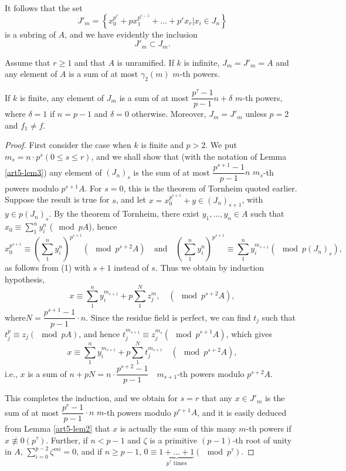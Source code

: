 It follows that the set 
$$
J'_m = \left\{ x_0^{p^r} + px_1^{p^{r-1}} + \ldots + p^r x_r | x_i \in J_n \right\}
$$
is a subring of $A$, and we have evidently the inclusion
$$
J'_m \subset J_m.
$$

\begin{prop}\label{art5-prop1}
Assume that $r \geq 1$ and that $A$ is unramified. If $k$ is infinite, $J_m = J'_m = A$ and any element of $A$ is a sum of at most $\gamma_2 (m)$ $m$-th powers.

If $k$ is finite, any element of $J_m$ is a sum of at most $\dfrac{p^\tau - 1}{p -1} n + \delta $ $m$-th powers, where $\delta=1$ if $n = p-1$ and $\delta =0$ otherwise. Moreover, $J_m = J'_m$ unless $p=2$ and $f_1 \neq f$.
\end{prop}


\begin{proof}
First consider the case when $k$ is finite and $p> 2$. We put $m_s = n \cdot p^s (0 \leq s \leq r)$, and we shall show that (with the notation of Lemma \ref{art5-lem3}) any element of $(J_n)_s$ is the sum of at most $\dfrac{p^{s+1} -1}{p-1} n$ $m_s$-th powers modulo $p^{s+1} A$. For $s=0$, this is the theorem of Tornheim quoted earlier. Suppose the result is true for $s$, and let $x = x_0^{p^{s+1}} + y \in (J_n)_{s+1}$, with $y \in p (J_n)_s$. By the theorem of Tornheim, there exist $y_1, \ldots, y_n \in A$ such that $x_0 \equiv \sum\limits^n_1 y^n_i$ ($\mod p A$), hence
{\fontsize{10pt}{12pt}\selectfont
$$
x_0^{p^{s+1}} \equiv \left( \sum\limits^n_1 y^n_i \right)^{p^{s+1}} (\mod p^{s+2} A) \quad \text{and} \quad \left(\sum\limits^n_1 y^n_i \right)^{p^{s+1}} \equiv \sum\limits^n_1 y^{m_{s+1}}_i (\mod p (J_n)_s),
$$}
as follows from (1) with $s+1$ instead of $s$. Thus we obtain by induction hypothesis,
$$
x \equiv \sum\limits^n_1 y^{m_{s+1}}_i  + p \sum\limits^N_1 z^m_j, \quad (\mod p^{s+2} A),
$$
where\pageoriginale $N = \dfrac{p^{s+1} -1}{p-1} \cdot n$. Since the residue field is perfect, we can find $t_j$ such that $t_j^p \equiv z_j (\mod p A)$, and hence $t_j^{m_{s+1}} \equiv z^{m_s}_j (\mod p^{s+1} A)$, which gives
$$
x \equiv \sum\limits^n_1 y^{m_{s+1}}_i + p \sum\limits^N_1 t^{m_{s+1}}_j \quad (\mod p^{s+2} A), 
$$ 
i.e., $x$ is a sum of $n+p N = n \cdot \dfrac{p^{s+2} -1}{p-1}\quad m_{s+1}$-th powers modulo $p^{s+2} A$.
 
This completes the induction, and we obtain for $s =r$ that any $x \in J'_m$ is the sum of at most $\dfrac{p^r -1}{p-1} \cdot n$ $m$-th powers modulo $p^{r+1}A$, and it is easily deduced from Lemma \ref{art5-lem2} that $x$ is actually the sum of this many $m$-th powers if $x \nequiv 0(p^{\tau})$. Further, if $n < p -1$ and $\zeta$ is a primitive $(p-1)$-th root of unity in $A$, $\sum\limits^{p-2}_{i=0} \zeta^{mi} = 0$, and if $n \geq p -1$, $0 \equiv \underbrace{1  + \ldots + 1}_{p^\tau \text{ times}} (\mod p^\tau)$. 


\end{proof}
